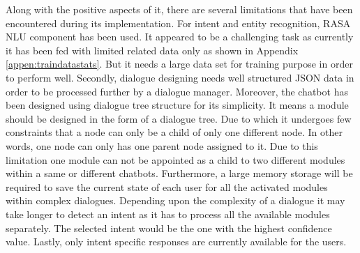 Along with the positive aspects of it, there are several limitations that have been encountered during its implementation. For intent and entity recognition, RASA NLU component has been used. It appeared to be a challenging task as currently it has been fed with limited related data only as shown in Appendix \ref{appen:traindatastats}. But it needs a large data set for training purpose in order to perform well. Secondly, dialogue designing needs well structured JSON data in order to be processed further by a dialogue manager. Moreover, the chatbot has been designed using dialogue tree structure for its simplicity. It means a module should be designed in the form of a dialogue tree. Due to which it undergoes few constraints that a node can only be a child of only one different node. In other words, one node can only has one parent node assigned to it. Due to this limitation one module can not be appointed as a child to two different modules within a same or different chatbots. Furthermore, a large memory storage will be required to save the current state of each user for all the activated modules within complex dialogues. Depending upon the complexity of a dialogue it may take longer to detect an intent as it has to process all the available modules separately. The selected intent would be the one with the highest confidence value. Lastly, only intent specific responses are currently available for the users.

